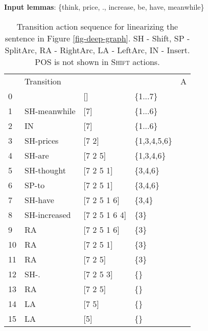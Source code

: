 \documentclass[11pt]{article}
\begin{document}
\begin{table}[t]
\centering
\scriptsize
\begin{tablenotes}
\item \textbf{Input lemmas}: \{think, price, ., increase,  be, have, meanwhile\} 
\end{tablenotes}
\vspace*{0.5em}
\begin{tabular}{lllll}
\hline
  & Transition     &     &      & A \\
0 &                & []          & \{1...7\} &                  \\ 
1 & {\sc SH}-meanwhile    & [7]         & \{1...6\} &                             \\ 2 & {\sc IN}    & [7]         & \{1...6\} &                             \\ 3 & {\sc SH}-prices    & [7 2]       & \{1,3,4,5,6\} &                             \\ 4 & {\sc SH}-are    & [7 2 5]     & \{1,3,4,6\} &                             \\ 5 & {\sc SH}-thought    & [7 2 5 1]   & \{3,4,6\}   &                             \\ 6 & {\sc SP}-to    & [7 2 5 1] & \{3,4,6\}     &                       \\ 7 & {\sc SH}-have    & [7 2 5 1 6]   & \{3,4\}   &                             \\ 8 & {\sc SH}-increased    & [7 2 5 1 6 4]   & \{3\}   &                             \\ 9 & {\sc RA} & [7 2 5 1 6]   & \{3\}     &  \\ 10 & {\sc RA} & [7 2 5 1]     & \{3\}     &  \\ 11 & {\sc RA} & [7 2 5]       & \{3\}     &  \\ 12 & {\sc SH}-.    & [7 2 5 3]     & \{\}      &                             \\ 13& {\sc RA} & [7 2 5]       & \{\}      &  \\ 14& {\sc LA}  & [7 5]         & \{\}      &   \\ 15& {\sc LA}  & [5]         & \{\}      &   \\ 

\hline
\end{tabular}
\caption{Transition action sequence for linearizing the sentence in Figure \ref{fig-deep-graph}. SH  - {\sc Shift}, SP - {\sc SplitArc}, RA - {\sc RightArc}, LA - {\sc LeftArc}, IN - {\sc Insert}. POS is not shown in \textsc{Shift} actions.}
\label{tbl:arc-standard-linearization}
\vspace*{-0.5em}
\end{table}	
  
\end{document}
